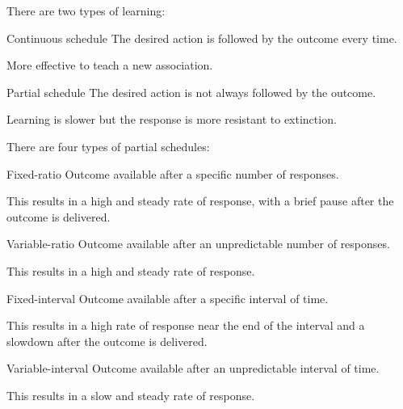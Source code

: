 There are two types of learning:
\begin{descriptionlist}
    \item[Continuous schedule] 
        The desired action is followed by the outcome every time.
        \begin{remark}
            More effective to teach a new association.
        \end{remark}

    \item[Partial schedule] 
        The desired action is not always followed by the outcome.
        \begin{remark}
            Learning is slower but the response is more resistant to extinction.
        \end{remark}

        There are four types of partial schedules:
        \begin{descriptionlist}
            \item[Fixed-ratio] 
                Outcome available after a specific number of responses.

                This results in a high and steady rate of response, with a brief pause after the outcome is delivered.


            \item[Variable-ratio] 
                Outcome available after an unpredictable number of responses.

                This results in a high and steady rate of response.


            \item[Fixed-interval] 
                Outcome available after a specific interval of time.

                This results in a high rate of response near the end of the interval and a slowdown after the outcome is delivered.


            \item[Variable-interval] 
                Outcome available after an unpredictable interval of time.

                This results in a slow and steady rate of response.
        \end{descriptionlist}
\end{descriptionlist}